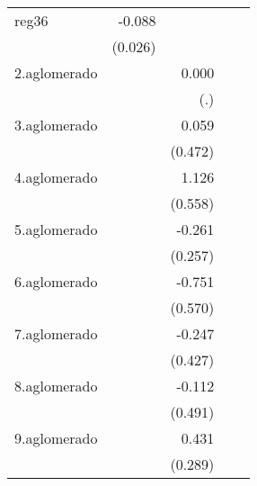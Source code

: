 {\begin{longtable}{l*{4}{D{.}{.}{-1}}}
\addlinespace
reg36       &      -0.088\sym{***}&                     &                     &                     \\
            &     (0.026)         &                     &                     &                     \\
\addlinespace
2.aglomerado&                     &       0.000         &                     &                     \\
            &                     &         (.)         &                     &                     \\
\addlinespace
3.aglomerado&                     &       0.059         &                     &                     \\
            &                     &     (0.472)         &                     &                     \\
\addlinespace
4.aglomerado&                     &       1.126\sym{*}  &                     &                     \\
            &                     &     (0.558)         &                     &                     \\
\addlinespace
5.aglomerado&                     &      -0.261         &                     &                     \\
            &                     &     (0.257)         &                     &                     \\
\addlinespace
6.aglomerado&                     &      -0.751         &                     &                     \\
            &                     &     (0.570)         &                     &                     \\
\addlinespace
7.aglomerado&                     &      -0.247         &                     &                     \\
            &                     &     (0.427)         &                     &                     \\
\addlinespace
8.aglomerado&                     &      -0.112         &                     &                     \\
            &                     &     (0.491)         &                     &                     \\
\addlinespace
9.aglomerado&                     &       0.431         &                     &                     \\
            &                     &     (0.289)         &                     &                     \\

\end{longtable}}
